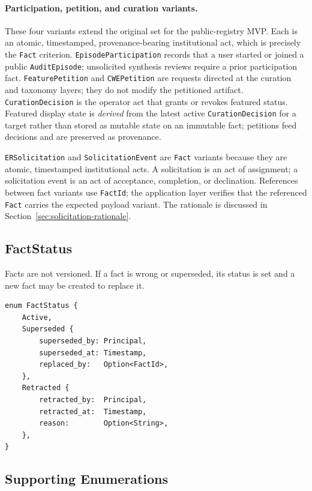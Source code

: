 \documentclass[11pt]{article}
\begin{document}
\paragraph{Participation, petition, and curation variants.} These four
variants extend the original set for the public-registry MVP. Each is an
atomic, timestamped, provenance-bearing institutional act, which is precisely
the \texttt{Fact} criterion. \texttt{EpisodeParticipation} records that a user
started or joined a public \texttt{AuditEpisode}; unsolicited synthesis
reviews require a prior participation fact. \texttt{FeaturePetition} and
\texttt{CWEPetition} are requests directed at the curation and taxonomy
layers; they do not modify the petitioned artifact. \texttt{CurationDecision}
is the operator act that grants or revokes featured status. Featured display
state is \emph{derived} from the latest active \texttt{CurationDecision} for a
target rather than stored as mutable state on an immutable fact; petitions
feed decisions and are preserved as provenance.

\texttt{ERSolicitation} and \texttt{SolicitationEvent} are \texttt{Fact}
variants because they are atomic, timestamped institutional acts. A solicitation
is an act of assignment; a solicitation event is an act of acceptance,
completion, or declination. References between fact variants use \texttt{FactId};
the application layer verifies that the referenced \texttt{Fact} carries the
expected payload variant. The rationale is discussed in
Section~\ref{sec:solicitation-rationale}.

\subsection{FactStatus}

Facts are not versioned. If a fact is wrong or superseded, its status is set
and a new fact may be created to replace it.

\begin{lstlisting}
enum FactStatus {
    Active,
    Superseded {
        superseded_by: Principal,
        superseded_at: Timestamp,
        replaced_by:   Option<FactId>,
    },
    Retracted {
        retracted_by:  Principal,
        retracted_at:  Timestamp,
        reason:        Option<String>,
    },
}
\end{lstlisting}

\subsection{Supporting Enumerations}
\end{document}
